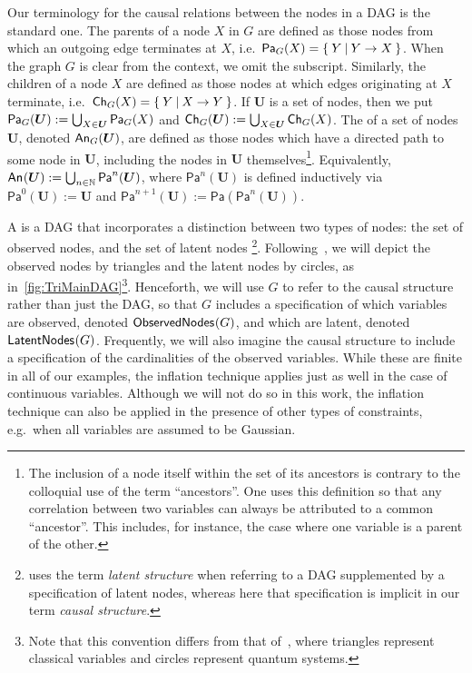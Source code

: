 \documentclass[aps,english,10pt,superscriptaddress,onecolumn,twoside,longbibliography,pra,floatfix,fleqn,nofootinbib]{revtex4-1}
\newcommand*{\tblue}[1]{{\color{MidnightBlue}{\textbf{#1}}}}
\theoremstyle{definition}
\newcounter{example}[section]
\newcommand{\An}[2][]{{\mathsf{An}_{#1}}\parenths{#2}}
\newcommand{\Pa}[2][]{{\mathsf{Pa}_{#1}}\parenths{#2}}
\newcommand{\Ch}[2][]{{\mathsf{Ch}_{#1}}\parenths{#2}}
\newcommand{\SmallNamedFunction}[3][]{\operatorname{\mathsf{#2}}_{#1}\parenths{#3}}
\newcommand{\obsnodes}[1]{\SmallNamedFunction{ObservedNodes}{#1}}
\newcommand{\latnodes}[1]{\SmallNamedFunction{LatentNodes}{#1}}
\DeclarePairedDelimiter{\parenths}{\lparen}{\rparen}
\begin{document}
Our terminology for the causal relations between the nodes in a DAG is the standard one. The parents of a node $X$ in $G$ are defined as those nodes from which an outgoing edge terminates at $X$, i.e.~$\Pa[G]{X} = \{\:Y\:|\:Y\to X\:\}$. When the graph $G$ is clear from the context, we omit the subscript. Similarly, the children of a node $X$ are defined as those nodes at which edges originating at $X$ terminate, i.e.~$\Ch[G]{X} = \{\:Y\:|\: X\to Y\:\}$. If $\bm{U}$ is a set of nodes, then we put $\Pa[G]{\bm{U}} := \bigcup_{X\in\bm{U}} \Pa[G]{X}$ and $\Ch[G]{\bm{U}} := \bigcup_{X\in\bm{U}} \Ch[G]{X}$. The \tblue{ancestors} of a set of nodes $\bm{U}$, denoted $\An[G]{\bm{U}}$, are defined as those nodes which have a directed path to some node in $\bm{U}$, including the nodes in $\bm{U}$ themselves\footnote{The inclusion of a node itself within the set of its ancestors is contrary to the colloquial use of the term ``ancestors''. 
One uses this definition so that any correlation between two variables can always be attributed to a common ``ancestor''. This includes, for instance, the case where one variable is a parent of the other.
}. 
Equivalently, $\An{\bm{U}} := \bigcup_{n\in\mathbb{N}} \mathsf{Pa}^n(\bm{U})$, where $\mathsf{Pa}^n(\bm{U})$ is defined inductively via $\mathsf{Pa}^0(\bm{U}) := \bm{U}$ and $\mathsf{Pa}^{n+1}(\bm{U}) := \mathsf{Pa}(\mathsf{Pa}^n(\bm{U}))$. 

A \tblue{causal structure} is a DAG that incorporates a distinction between two types of nodes: the set of observed nodes, 
and the set of latent nodes \footnote{\citet[Def. 2.3.2]{pearl2009causality} uses the term \emph{latent structure} when referring to a DAG supplemented by a specification of latent nodes, whereas here that specification is implicit in our term \emph{causal structure}.}. 
Following~\cite{pusey2014gdag}, we will depict the observed nodes by triangles and the latent nodes by circles, as in~\cref{fig:TriMainDAG}\footnote{Note that this convention differs from that of~\cite{leifer2013conditionalstates}, where triangles represent classical variables and circles represent quantum systems.}. Henceforth, we will use $G$ to refer to the causal structure rather than just the DAG, so that $G$ includes a specification of which variables are observed, denoted $\obsnodes{G}$, and which are latent, denoted $\latnodes{G}$.
Frequently, we will also imagine the causal structure to include a specification of the cardinalities of the observed variables. While these are finite in all of our examples, the inflation technique applies just as well in the case of continuous variables. 
Although we will not do so in this work, the inflation technique can also be applied in the presence of other types of constraints, e.g.~when all variables are assumed to be Gaussian. 
\end{document}
